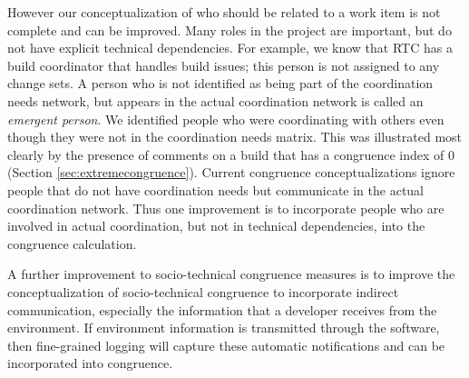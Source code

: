 \documentclass[12pt,oneside]{book}
\begin{document}




However our conceptualization of who should be related to a work item is not complete and can be improved.
Many roles in the project are important, but do not have explicit technical dependencies.
For example, we know that RTC has a build coordinator that handles build issues; this person is not assigned to any change sets.
A person who is not identified as being part of the coordination needs network, but appears in the actual coordination network is called an \emph{emergent person}\cite{damian2007:collaboration}.
We identified people who were coordinating with others even though they were not in the coordination needs matrix.
This was illustrated most clearly by the presence of comments on a build that has a congruence index of 0 (Section \ref{sec:extremecongruence}).
Current congruence conceptualizations ignore people that do not have coordination needs but communicate in the actual coordination network.
Thus one improvement is to incorporate people who are involved in actual coordination, but not in technical dependencies, into the congruence calculation. 

A further improvement to socio-technical congruence measures is to improve the
conceptualization of socio-technical congruence to incorporate indirect
communication, especially the information that a developer receives from the
environment. If environment information is transmitted through the software, then fine-grained logging will capture these automatic notifications and can be incorporated into congruence.
\end{document}

